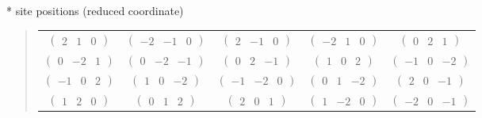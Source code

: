 \documentclass[fleqn,9pt,landscape]{jsarticle}
\begin{document}
\vspace{5mm}
* site positions (reduced coordinate)
\begin{quote}
\begin{tabular}{ccccc}
$ \begin{pmatrix} 2 & 1 & 0 \end{pmatrix} $ & $ \begin{pmatrix} -2 & -1 & 0 \end{pmatrix} $ & $ \begin{pmatrix} 2 & -1 & 0 \end{pmatrix} $ & $ \begin{pmatrix} -2 & 1 & 0 \end{pmatrix} $ & $ \begin{pmatrix} 0 & 2 & 1 \end{pmatrix} $ \\
$ \begin{pmatrix} 0 & -2 & 1 \end{pmatrix} $ & $ \begin{pmatrix} 0 & -2 & -1 \end{pmatrix} $ & $ \begin{pmatrix} 0 & 2 & -1 \end{pmatrix} $ & $ \begin{pmatrix} 1 & 0 & 2 \end{pmatrix} $ & $ \begin{pmatrix} -1 & 0 & -2 \end{pmatrix} $ \\
$ \begin{pmatrix} -1 & 0 & 2 \end{pmatrix} $ & $ \begin{pmatrix} 1 & 0 & -2 \end{pmatrix} $ & $ \begin{pmatrix} -1 & -2 & 0 \end{pmatrix} $ & $ \begin{pmatrix} 0 & 1 & -2 \end{pmatrix} $ & $ \begin{pmatrix} 2 & 0 & -1 \end{pmatrix} $ \\
$ \begin{pmatrix} 1 & 2 & 0 \end{pmatrix} $ & $ \begin{pmatrix} 0 & 1 & 2 \end{pmatrix} $ & $ \begin{pmatrix} 2 & 0 & 1 \end{pmatrix} $ & $ \begin{pmatrix} 1 & -2 & 0 \end{pmatrix} $ & $ \begin{pmatrix} -2 & 0 & -1 \end{pmatrix} $ \\

\end{tabular}
\end{quote}
\end{document}
